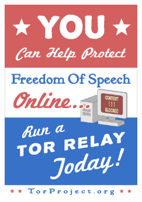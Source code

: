 \begin{frame}[plain]
  \begin{center}
    \href{https://www.torproject.org/docs/tor-doc-relay.html.en}
    {\includegraphics[width=6cm]{runtor}}
  \end{center}
\end{frame}



